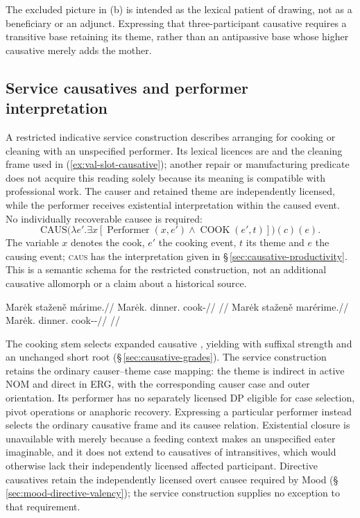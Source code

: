 The excluded picture in (b) is intended as the lexical patient of drawing,
not as a beneficiary or an adjunct. Expressing that three-participant
causative requires a transitive base retaining its theme, rather than an
antipassive base whose higher causative merely adds the mother.


\subsection{Service causatives and performer interpretation}
\label{sec:causative-service}\label{sec:service-causative}

A restricted indicative service construction describes arranging for cooking
or cleaning with an unspecified performer. Its lexical licences are 
 and the cleaning frame used in
(\ref{ex:val-slot-causative}); another repair or manufacturing predicate does
not acquire this reading solely because its meaning is compatible with
professional work. The causer and retained theme are independently licensed,
while the performer receives existential interpretation within the caused
event. No individually recoverable causee is required:
\[
 \mathrm{CAUS}\bigl(\lambda e'.\exists x
 [\operatorname{Performer}(x,e')\land\operatorname{COOK}(e',t)]\bigr)(c)(e).
\]
The variable $x$ denotes the cook, $e'$ the cooking event, $t$ its theme
and $e$ the causing event; \textsc{caus} has the interpretation given in
§\,\ref{sec:causative-productivity}.
This is a semantic schema for the restricted construction, not an additional
causative allomorph or a claim about a historical source.

\pex\label{ex:val-service-causative}
\a
\begingl
\gla Marėk staženě márime.//
\glb Marėk.\Dir{} dinner.\Ind{} cook-\Prog{}//
\glft {}//
\endgl
\a
\begingl
\gla Marėk staženě marérime.//
\glb Marėk.\Dir{} dinner.\Ind{} cook-\Caus{}-\Prog{}//
\glft {}
//
\endgl
\xe

The cooking stem selects expanded causative , yielding
 with suffixal strength and an unchanged short root
(§\,\ref{sec:causative-grades}).
The service construction retains the ordinary causer--theme case mapping:
the theme is indirect in active NOM and direct in ERG, with the corresponding
causer case and outer orientation. Its performer has no separately licensed
DP eligible for case selection, pivot operations or anaphoric recovery.
Expressing a particular performer instead selects the ordinary causative
frame and its causee relation. Existential closure is unavailable with
 merely because a feeding context makes an unspecified eater
imaginable, and it does not extend to causatives of intransitives, which
would otherwise lack their independently licensed affected participant.
Directive causatives retain the independently licensed overt causee required
by Mood (§\,\ref{sec:mood-directive-valency}); the service construction
supplies no exception to that requirement.

